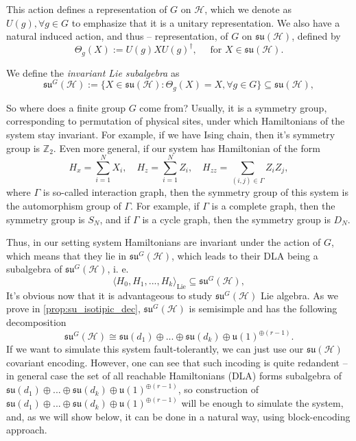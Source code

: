 \documentclass[twocolumn,superscriptaddress,aps,showpacs,amsmath,amstex,amssymb,citeautoscript,floatfix,pra,preprintnumbers]{revtex4-2}
\newcounter{alg}
\theoremstyle{plain}
\theoremstyle{plain}
\theoremstyle{plain}
\theoremstyle{plain}
\theoremstyle{plain}
\theoremstyle{plain}
\begin{document}
This action defines a representation of $G$ on $\mathcal{H}$, which we denote as $U(g), \forall g\in G$ to emphasize that it is a unitary representation. 
We also have a natural induced action, and thus -- representation, of $G$ on $\mathfrak{su}(\mathcal{H})$, defined by
\[
    \Theta_g(X):=U(g) X U(g)^{\dagger}, \quad \text { for } X \in \mathfrak{su}(\mathcal{H}).
\]

We define the \textit{invariant Lie subalgebra} as
\begin{equation}
    \mathfrak{su}^G(\mathcal{H}) := \{ X \in \mathfrak{su}(\mathcal{H}) : \Theta_g(X) = X, \forall g \in G \}\subseteq \mathfrak{su}(\mathcal{H}),
\end{equation}

So where does a finite group $G$ come from? Usually, it is a symmetry group,
corresponding to permutation of physical sites, under which Hamiltonians of the system
stay invariant. For example, if we have Ising chain, then it's symmetry group is $\mathbb{Z}_2$.
Even more general, if our system has Hamiltonian of the form
\[
    H_x=\sum_{i=1}^N X_i, \quad H_z=\sum_{i=1}^N Z_i, \quad H_{zz}=\sum_{(i, j)\in \Gamma} Z_i Z_{j},
\]
where $\Gamma$ is so-called interaction graph, then the symmetry group of this system is the automorphism group of $\Gamma$.
For example, if $\Gamma$ is a complete graph, then the symmetry group is $S_N$, and if $\Gamma$ is a cycle graph, then the symmetry group is $D_N$.

Thus, in our setting system Hamiltonians are invariant under the action of $G$, which means that they lie in $\mathfrak{su}^G(\mathcal{H})$, which leads to their DLA being a subalgebra of $\mathfrak{su}^G(\mathcal{H})$, i. e.
\[
    \langle H_0, H_1, ..., H_k \rangle_{\text{Lie}} \subseteq \mathfrak{su}^G(\mathcal{H}),
\]
It's obvious now that it is advantageous to study $\mathfrak{su}^G(\mathcal{H})$ Lie algebra.
As we prove in \ref{prop:su_isotipic_dec}, $\mathfrak{su}^G(\mathcal{H})$ is semisimple and has the following decomposition
\[
    \mathfrak{su}^G(\mathcal{H})\cong \mathfrak{su}(d_1)\oplus...\oplus\mathfrak{su}(d_k)\oplus \mathfrak{u}(1)^{\oplus(r-1)}.
\]
If we want to simulate this system fault-tolerantly, we can
just use our $\mathfrak{su}(\mathcal{H})$ covariant encoding. However, one can see that such incoding is quite redandent -- in general
case the set of all reachable Hamiltonians (DLA) forms subalgebra of $\mathfrak{su}(d_1)\oplus...\oplus\mathfrak{su}(d_k)\oplus \mathfrak{u}(1)^{\oplus(r-1)}$,
so construction of $\mathfrak{su}(d_1)\oplus...\oplus\mathfrak{su}(d_k)\oplus \mathfrak{u}(1)^{\oplus(r-1)}$ will be enough to simulate the system, and, as we will 
show below, it can be done in a natural way, using block-encoding approach.
\end{document}
